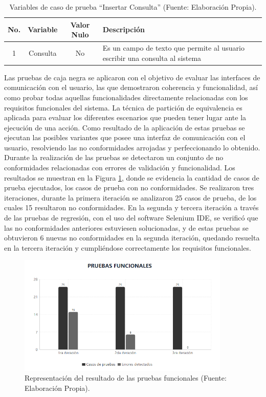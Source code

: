 \begin{table}[H]
	\centering
	\begin{tabular}{|c|c|c|p{8.5cm}|}
		\hline
		\textbf{No.} & \textbf{Variable} & \textbf{Valor Nulo} & \textbf{Descripción} \\
		\hline
		1 & Consulta & No & Es un campo de texto que permite al usuario escribir una consulta al sistema \\
		\hline
	\end{tabular}
	\caption{Variables de caso de prueba “Insertar Consulta” (Fuente: Elaboración Propia).}
	\label{tab:variables_insertar_consulta}
\end{table}

Las pruebas de caja negra se aplicaron con el objetivo de evaluar las interfaces de comunicación con el
usuario, las que demostraron coherencia y funcionalidad, así como probar todas aquellas funcionalidades
directamente relacionadas con los requisitos funcionales del sistema. La técnica de partición de equivalencia
es aplicada para evaluar los diferentes escenarios que pueden tener lugar ante la ejecución de una acción.
Como resultado de la aplicación de estas pruebas se ejecutan las posibles variantes que posee una interfaz
de comunicación con el usuario, resolviendo las no conformidades arrojadas y perfeccionando lo obtenido.
Durante la realización de las pruebas se detectaron un conjunto de no conformidades relacionadas con
errores de validación y funcionalidad. Los resultados se muestran en la Figura \ref{fig:grafica_rf}, donde se evidencia la cantidad de casos de prueba ejecutados, los casos de prueba con no conformidades. Se realizaron tres
iteraciones, durante la primera iteración se analizaron 25 casos de prueba, de los cuales 15 resultaron no conformidades. En la segunda y tercera iteración a través de las pruebas de regresión, con el uso del software
Selenium IDE, se verificó que las no conformidades anteriores estuviesen solucionadas, y de estas pruebas
se obtuvieron 6 nuevas no conformidades en la segunda iteración, quedando resuelta en la tercera iteración y
cumpliéndose correctamente los requisitos funcionales.

\begin{figure}[htbp] %
	\centering
	\includegraphics[width=0.9\textwidth]{images/grafica_pruebas_funcionales.PNG} 
	\caption{Representación del resultado de las pruebas funcionales (Fuente: Elaboración Propia).}
	\label{fig:grafica_rf}
\end{figure}

